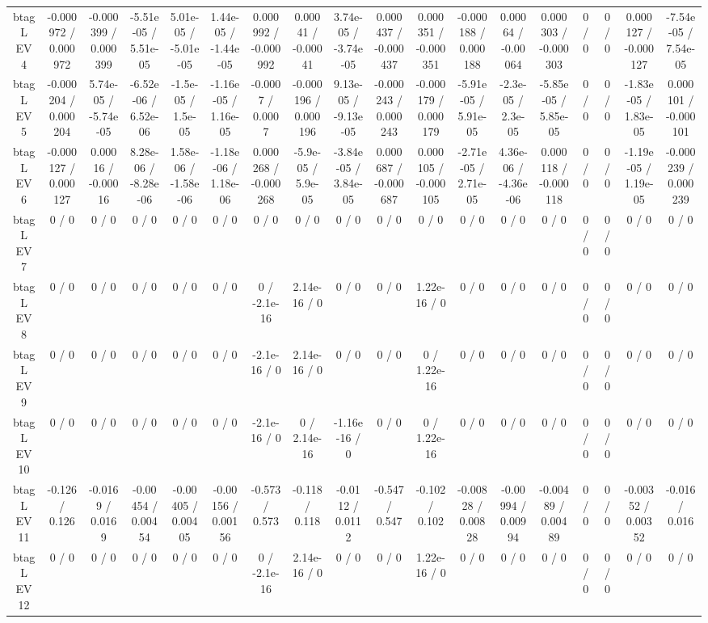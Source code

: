 \documentclass[10pt]{article}
\begin{document}
\begin{table}[htbp]
\begin{center}
\begin{tabular}{|c|c|c|c|c|c|c|c|c|c|c|c|c|c|c|c|c|c|}
  btag L EV 4 & -0.000972 / 0.000972 & -0.000399 / 0.000399 & -5.51e-05 / 5.51e-05 & 5.01e-05 / -5.01e-05 & 1.44e-05 / -1.44e-05 & 0.000992 / -0.000992 & 0.00041 / -0.00041 & 3.74e-05 / -3.74e-05 & 0.000437 / -0.000437 & 0.000351 / -0.000351 & -0.000188 / 0.000188 & 0.00064 / -0.00064 & 0.000303 / -0.000303 & 0 / 0 & 0 / 0 & 0.000127 / -0.000127 & -7.54e-05 / 7.54e-05 \\ 
  btag L EV 5 & -0.000204 / 0.000204 & 5.74e-05 / -5.74e-05 & -6.52e-06 / 6.52e-06 & -1.5e-05 / 1.5e-05 & -1.16e-05 / 1.16e-05 & -0.0007 / 0.0007 & -0.000196 / 0.000196 & 9.13e-05 / -9.13e-05 & -0.000243 / 0.000243 & -0.000179 / 0.000179 & -5.91e-05 / 5.91e-05 & -2.3e-05 / 2.3e-05 & -5.85e-05 / 5.85e-05 & 0 / 0 & 0 / 0 & -1.83e-05 / 1.83e-05 & 0.000101 / -0.000101 \\ 
  btag L EV 6 & -0.000127 / 0.000127 & 0.00016 / -0.00016 & 8.28e-06 / -8.28e-06 & 1.58e-06 / -1.58e-06 & -1.18e-06 / 1.18e-06 & 0.000268 / -0.000268 & -5.9e-05 / 5.9e-05 & -3.84e-05 / 3.84e-05 & 0.000687 / -0.000687 & 0.000105 / -0.000105 & -2.71e-05 / 2.71e-05 & 4.36e-06 / -4.36e-06 & 0.000118 / -0.000118 & 0 / 0 & 0 / 0 & -1.19e-05 / 1.19e-05 & -0.000239 / 0.000239 \\ 
  btag L EV 7 & 0 / 0 & 0 / 0 & 0 / 0 & 0 / 0 & 0 / 0 & 0 / 0 & 0 / 0 & 0 / 0 & 0 / 0 & 0 / 0 & 0 / 0 & 0 / 0 & 0 / 0 & 0 / 0 & 0 / 0 & 0 / 0 & 0 / 0 \\ 
  btag L EV 8 & 0 / 0 & 0 / 0 & 0 / 0 & 0 / 0 & 0 / 0 & 0 / -2.1e-16 & 2.14e-16 / 0 & 0 / 0 & 0 / 0 & 1.22e-16 / 0 & 0 / 0 & 0 / 0 & 0 / 0 & 0 / 0 & 0 / 0 & 0 / 0 & 0 / 0 \\ 
  btag L EV 9 & 0 / 0 & 0 / 0 & 0 / 0 & 0 / 0 & 0 / 0 & -2.1e-16 / 0 & 2.14e-16 / 0 & 0 / 0 & 0 / 0 & 0 / 1.22e-16 & 0 / 0 & 0 / 0 & 0 / 0 & 0 / 0 & 0 / 0 & 0 / 0 & 0 / 0 \\ 
  btag L EV 10 & 0 / 0 & 0 / 0 & 0 / 0 & 0 / 0 & 0 / 0 & -2.1e-16 / 0 & 0 / 2.14e-16 & -1.16e-16 / 0 & 0 / 0 & 0 / 1.22e-16 & 0 / 0 & 0 / 0 & 0 / 0 & 0 / 0 & 0 / 0 & 0 / 0 & 0 / 0 \\ 
  btag L EV 11 & -0.126 / 0.126 & -0.0169 / 0.0169 & -0.00454 / 0.00454 & -0.00405 / 0.00405 & -0.00156 / 0.00156 & -0.573 / 0.573 & -0.118 / 0.118 & -0.0112 / 0.0112 & -0.547 / 0.547 & -0.102 / 0.102 & -0.00828 / 0.00828 & -0.00994 / 0.00994 & -0.00489 / 0.00489 & 0 / 0 & 0 / 0 & -0.00352 / 0.00352 & -0.016 / 0.016 \\ 
  btag L EV 12 & 0 / 0 & 0 / 0 & 0 / 0 & 0 / 0 & 0 / 0 & 0 / -2.1e-16 & 2.14e-16 / 0 & 0 / 0 & 0 / 0 & 1.22e-16 / 0 & 0 / 0 & 0 / 0 & 0 / 0 & 0 / 0 & 0 / 0 & 0 / 0 & 0 / 0 \\ 

\end{tabular}
\end{center}
\end{table}
\end{document}
